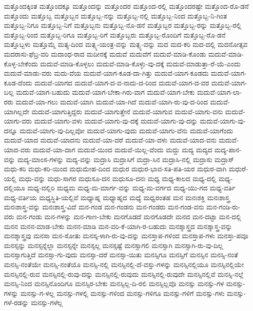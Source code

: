 {ಮತ್ತೊಂದಕ್ಕಿಂತ
ಮತ್ತೊಂದಕ್ಕೂ
ಮತ್ತೊಂದನ್ನು
ಮತ್ತೊಂದರ
ಮತ್ತೊಂದ-ರಲ್ಲಿ
ಮತ್ತೊಂದರಷ್ಟೇ
ಮತ್ತೊಂದ-ರೊ-ಡನೆ
ಮತ್ತೊಂದು
ಮತ್ತೊಬ್ಬ
ಮತ್ತೊಬ್ಬನ
ಮತ್ತೊಬ್ಬ-ನನ್ನು
ಮತ್ತೊಬ್ಬ-ನಲ್ಲಿ
ಮತ್ತೊಬ್ಬ-ನಿಂದ
ಮತ್ತೊಬ್ಬ-ನಿ-ಗಿಂತ
ಮತ್ತೊಬ್ಬ-ನಿಗೂ
ಮತ್ತೊಬ್ಬ-ನಿಗೆ
ಮತ್ತೊಬ್ಬನು
ಮತ್ತೊಬ್ಬ-ನೊ-ಡನೆ
ಮತ್ತೊಬ್ಬರ
ಮತ್ತೊಬ್ಬ-ರನ್ನು
ಮತ್ತೊಬ್ಬ-ರಲ್ಲಿ
ಮತ್ತೊಬ್ಬ-ರಿಂದ
ಮತ್ತೊಬ್ಬ-ರಿಗೂ
ಮತ್ತೊಬ್ಬ-ರಿಗೆ
ಮತ್ತೊಬ್ಬರು
ಮತ್ತೊಬ್ಬ-ರೊಂದಿಗೆ
ಮತ್ತೊಬ್ಬ-ರೊ-ಡನೆ
ಮತ್ತೊಬ್ಬಳು
ಮತ್ತೊಮ್ಮೆ
ಮತ್ಯ-ದಿಂದ
ಮತ್ಸ್ಯ-ಯಂತ್ರ-ವನ್ನು
ಮತ್ಸ್ಯ-ವನ್ನು
ಮದ
ಮದ-ಕರಿ
ಮದ-ದಲ್ಲಿ
ಮದನೋತ್ಸವ
ಮದರಾಸು-ಫೆಬ್ರ-ವರಿ
ಮದಾಂಧ-ರಾದ
ಮದೀನಕ್ಕೆ
ಮದುವೆ
ಮದುವೆಗೆ
ಮದುವೆ-ಮಾಡಿ-ಕೊಂಡು
ಮದುವೆ-ಮಾಡಿ-ಕೊಳ್ಳ-ಬೇಕೆಂದು
ಮದುವೆ-ಮಾಡಿ-ಕೊಳ್ಳಲು
ಮದುವೆ-ಮಾಡಿ-ಕೊಳ್ಳು-ವು-ದಕ್ಕೆ
ಮದುವೆ-ಮಾಡುತ್ತಾ-ರೆ-ಯೆ-ಎಂದು
ಮದುವೆ-ಮಾಡು-ವರು
ಮದು-ವೆಯ
ಮದುವೆ-ಯಾಗ-ಕೂಡ-ದಾ-ಗಿತ್ತು
ಮದುವೆ-ಯಾಗ-ಕೂಡದು
ಮದುವೆ-ಯಾಗ-ಕೂಡ-ದೆಂದು
ಮದುವೆ-ಯಾಗದ
ಮದುವೆ-ಯಾಗ-ದ-ವ-ನಾದು-ದ-ರಿಂದ
ಮದುವೆ-ಯಾಗ-ದ-ವರ
ಮದುವೆ-ಯಾಗ-ಬಲ್ಲ
ಮದುವೆ-ಯಾಗ-ಬಹುದು
ಮದುವೆ-ಯಾಗ-ಬೇಕಾ-ಗಿರು-ವಾಗ
ಮದುವೆ-ಯಾಗ-ಬೇಕು
ಮದುವೆ-ಯಾಗ-ಲಾ-ರರು
ಮದುವೆ-ಯಾ-ಗಲು
ಮದುವೆ-ಯಾಗಿ
ಮದುವೆ-ಯಾ-ಗಿದೆ
ಮದುವೆ-ಯಾಗಿ-ರು-ವು-ದ-ರಿಂದ
ಮದುವೆ-ಯಾಗಿಲ್ಲದೇ
ಮದುವೆ-ಯಾಗುತ್ತಿದ್ದರು
ಮದುವೆ-ಯಾಗುತ್ತೇನೆ
ಮದುವೆ-ಯಾಗುವ
ಮದುವೆ-ಯಾಗು-ವನು
ಮದುವೆ-ಯಾಗು-ವರು
ಮದುವೆ-ಯಾಗು-ವಳು
ಮದುವೆ-ಯಾಗು-ವು-ದಕ್ಕೆ
ಮದುವೆ-ಯಾಗು-ವು-ದನ್ನು
ಮದುವೆ-ಯಾಗು-ವು-ದನ್ನೂ
ಮದುವೆ-ಯಾಗು-ವು-ದಿಲ್ಲವೋ
ಮದುವೆ-ಯಾಗು-ವುದು
ಮದುವೆ-ಯಾಗು-ವೆನು
ಮದುವೆ-ಯಾಗೆಂದು
ಮದುವೆ-ಯಾದ
ಮದುವೆ-ಯಾದನು
ಮದುವೆ-ಯಾ-ದರೆ
ಮದುವೆ-ಯಾ-ದಳು
ಮದುವೆ-ಯಾದ-ವನು
ಮದುವೆ-ಯಾದ-ವರು
ಮದುವೆ-ಯಾ-ದಾಗ
ಮದುವೆ-ಯಿಂದ
ಮದುವೆ-ಯಿಲ್ಲ-ವೆಂದು
ಮದ್ದು
ಮದ್ಯ
ಮದ್ಯದ
ಮದ್ಯ-ಪಾನ-ವನ್ನು
ಮದ್ಯ-ಮಾಂಸ-ಗಳನ್ನು
ಮದ್ಯ-ವನ್ನು
ಮದ್ರಾಸಿ
ಮದ್ರಾಸಿಗೆ
ಮದ್ರಾ-ಸಿನ
ಮದ್ರಾಸಿ-ನಲ್ಲಿ
ಮದ್ರಾಸು
ಮದ್ರಾಸ್
ಮಧು-ಕರಿ
ಮಧು-ಕರಿ-ಯಿಂದ
ಮಧುಮೇಹ-ದಿಂದ
ಮಧುರ
ಮಧುರ-ಭಾವ-ಸತಿ-ಪತಿ-ಯರ
ಮಧುರ-ವಾಗಿ
ಮಧುರೆ-ಯಲ್ಲಿ
ಮಧು-ವನ್ನು
ಮಧು-ಸಾಗರ
ಮಧುಸೂ-ದನ
ಮಧುಸೂ-ದನಃ
ಮಧ್ಯ
ಮಧ್ಯ-ಕಾಲದ
ಮಧ್ಯ-ದಲ್ಲಿ
ಮಧ್ಯ-ದಲ್ಲಿಯೂ
ಮಧ್ಯ-ದಲ್ಲಿರಿ
ಮಧ್ಯಮ
ಮಧ್ಯ-ಮ-ಮಾರ್ಗ-ವನ್ನು
ಮಧ್ಯ-ಮ-ವರ್ಗದ
ಮಧ್ಯ-ಯು-ಗದ
ಮಧ್ಯ-ವರ್ತಿ
ಮಧ್ಯ-ವರ್ತಿಯ
ಮಧ್ಯಸ್ಥಿತಿ-ಯಲ್ಲಿವೆ
ಮಧ್ಯಾಹ್ನ
ಮಧ್ಯಾಹ್ನದ
ಮಧ್ಯೆ
ಮಧ್ವರಂತಹ
ಮನ
ಮನಃಶಕ್ತಿ
ಮನಃಶಾಸ್ತ್ರ
ಮನಃಶಾಸ್ತ್ರ-ವನ್ನು
ಮನಃಶಾಸ್ತ್ರ-ವಿದೆ
ಮನ-ಗಂಡ
ಮನ-ಗಂಡನು
ಮನ-ಗಂಡರು
ಮನ-ಗಂಡ-ವನು
ಮನ-ಗಂಡಿ-ರು-ವರು
ಮನ-ಗಂಡು
ಮನ-ಗಳನ್ನು
ಮನ-ಗಾಣ-ಬೇಕು
ಮನಗೊಡದೆ
ಮನಗೊಡದೇ
ಮನದ
ಮನ-ದಟ್ಟಾ
ಮನ-ದಲ್ಲಿ
ಮನನ
ಮನನ-ಮಾಡ-ಬೇಕು
ಮನನ-ಮಾಡಿ
ಮನ-ವರಿ-ಕೆ-ಯಾಗಿ-ರ-ಬಹುದು
ಮನಶ್ಶಾಸ್ತ್ರದ
ಮನಶ್ಶಾಸ್ತ್ರ-ವನ್ನು
ಮನಶ್ಶಾಸ್ತ್ರವು
ಮನಸಾ
ಮನ-ಸೋತು
ಮನಸ್ಕ-ಳಾಗಿ-ರು-ವು-ದನ್ನು
ಮನಸ್ತಾಪ-ಗಳಿಂದ
ಮನಸ್ತಾಪ-ಗಳು
ಮನಸ್ತಾ-ಪವೂ
ಮನಸ್ಸನ್ನು
ಮನಸ್ಸನ್ನೆಲ್ಲಾ
ಮನಸ್ಸನ್ನೇ
ಮನಸ್ಸಲ್ಲ
ಮನಸ್ಸಷ್ಟೆ
ಮನಸ್ಸಾಗಲಿ
ಮನಸ್ಸಾಗಿ
ಮನಸ್ಸಾಗಿ-ರು-ವು-ದಿಲ್ಲ
ಮನಸ್ಸಾಗುತ್ತಿದೆ
ಮನಸ್ಸಾ-ಗು-ವುದು
ಮನಸ್ಸಾ-ದರೆ
ಮನಸ್ಸಾ-ಯಿತು
ಮನಸ್ಸಿಗೂ
ಮನಸ್ಸಿಗೆ
ಮನಸ್ಸಿನ
ಮನಸ್ಸಿ-ನಂತೆ
ಮನಸ್ಸಿ-ನಂತೆಯೇ
ಮನಸ್ಸಿ-ನಂತೆಯೊ
ಮನಸ್ಸಿ-ನಲ್ಲಿ
ಮನಸ್ಸಿನಲ್ಲಿ-ದೆ-ವಸ್ತು-ಗಳನ್ನು
ಮನಸ್ಸಿನಲ್ಲಿಯೂ
ಮನಸ್ಸಿನಲ್ಲಿಯೇ
ಮನಸ್ಸಿನಲ್ಲಿ-ರುವ
ಮನಸ್ಸಿನಲ್ಲಿ-ರುವು-ದನ್ನು
ಮನಸ್ಸಿನಲ್ಲಿ-ರುವುದು
ಮನಸ್ಸಿನಲ್ಲಿ-ರುವುದೇ
ಮನಸ್ಸಿನಲ್ಲಿವೆ
ಮನಸ್ಸಿ-ನಲ್ಲೆ
ಮನಸ್ಸಿ-ನಿಂದ
ಮನಸ್ಸಿನೊಂದಿಗೂ
ಮನಸ್ಸಿರ-ಬೇಕು
ಮನಸ್ಸಿಲ್ಲ-ದಿ-ರಲಿ
ಮನಸ್ಸಿಲ್ಲವೊ
ಮನಸ್ಸು
ಮನಸ್ಸು-ಗಳ
ಮನಸ್ಸು-ಗಳನ್ನು
ಮನಸ್ಸು-ಗ-ಳಲ್ಲ
ಮನಸ್ಸು-ಗಳಲ್ಲಿ
ಮನಸ್ಸು-ಗಳಿಂದ
ಮನಸ್ಸು-ಗಳಿಗೂ
ಮನಸ್ಸು-ಗಳಿಗೆ
ಮನಸ್ಸು-ಗಳು
ಮನಸ್ಸು-ಗಳೆ-ರಡನ್ನು
ಮನಸ್ಸು-ಗಳೆಲ್ಲ
}
